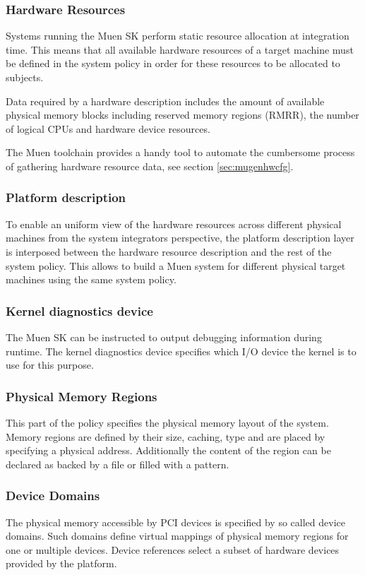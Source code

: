 \documentclass[a4paper,twoside,titlepage]{article}
\begin{document}
\subsubsection{Hardware Resources}
Systems running the Muen SK perform static resource allocation at integration
time. This means that all available hardware resources of a target machine must
be defined in the system policy in order for these resources to be allocated to
subjects.

Data required by a hardware description includes the amount of available
physical memory blocks including reserved memory regions (RMRR), the number of
logical CPUs and hardware device resources.

The Muen toolchain provides a handy tool to automate the cumbersome process of
gathering hardware resource data, see section \ref{sec:mugenhwcfg}.

\subsubsection{Platform description}
To enable an uniform view of the hardware resources across different physical
machines from the system integrators perspective, the platform description layer
is interposed between the hardware resource description and the rest of the
system policy. This allows to build a Muen system for different physical target
machines using the same system policy.

\subsubsection{Kernel diagnostics device}
The Muen SK can be instructed to output debugging information during runtime.
The kernel diagnostics device specifies which I/O device the kernel is to use
for this purpose.

\subsubsection{Physical Memory Regions}
This part of the policy specifies the physical memory layout of the system.
Memory regions are defined by their size, caching, type and are placed by
specifying a physical address. Additionally the content of the region can be
declared as backed by a file or filled with a pattern.

\subsubsection{Device Domains}
The physical memory accessible by PCI devices is specified by so called device
domains. Such domains define virtual mappings of physical memory regions for one
or multiple devices. Device references select a subset of hardware devices
provided by the platform.
\end{document}
